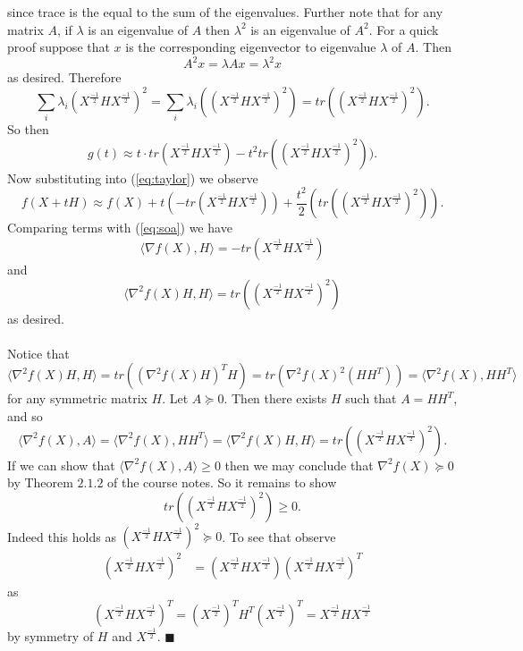 \documentclass[letterpaper,12pt,oneside,onecolumn]{article}
\newcommand{\1}{\mathbbm{1}}
\begin{document}
since trace is the equal to the sum of the eigenvalues. Further note that for any matrix $A$, if $\lambda$ is an eigenvalue of $A$ then $\lambda^2$ is an eigenvalue of $A^2$. For a quick proof suppose that $x$ is the corresponding eigenvector to eigenvalue $\lambda$ of $A$. Then
$$A^2x = \lambda Ax = \lambda^2x$$
as desired. Therefore
$$\sum_{i} \lambda_i(X^\frac{-1}{2}HX^\frac{-1}{2})^2 = \sum_{i} \lambda_i((X^\frac{-1}{2}HX^\frac{-1}{2})^2) = tr((X^\frac{-1}{2}HX^\frac{-1}{2})^2).$$
So then
$$g(t) \approx t\cdot tr(X^\frac{-1}{2}HX^\frac{-1}{2}) - t^2 tr((X^\frac{-1}{2}HX^\frac{-1}{2})^2)).$$
Now substituting into (\ref{eq:taylor}) we observe
$$f(X+tH) \approx f(X) + t(-tr(X^\frac{-1}{2}HX^\frac{-1}{2})) + \frac{t^2}{2}(tr((X^\frac{-1}{2}HX^\frac{-1}{2})^2)).$$
Comparing terms with (\ref{eq:soa}) we have
$$\langle \nabla f(X), H \rangle = -tr(X^\frac{-1}{2}HX^\frac{-1}{2})$$
and
$$\langle \nabla^2f(X)H, H\rangle = tr((X^\frac{-1}{2}HX^\frac{-1}{2})^2)$$
as desired.
\paragraph{}
Notice that
$$\langle \nabla^2f(X)H, H\rangle = tr((\nabla^2f(X)H)^TH) = tr(\nabla^2f(X)^2(HH^T)) = \langle \nabla^2f(X), HH^T\rangle$$
for any symmetric matrix $H$.
Let $A \succcurlyeq 0$. Then there exists $H$ such that $A = HH^T$, and so
$$\langle\nabla^2f(X), A \rangle = \langle \nabla^2f(X), HH^T\rangle = \langle \nabla^2f(X)H, H\rangle = tr((X^\frac{-1}{2}HX^\frac{-1}{2})^2).$$
If we can show that $\langle\nabla^2f(X), A \rangle \geq 0$ then we may conclude that $\nabla^2f(X) \succcurlyeq 0$ by Theorem $2.1.2$ of the course notes. So it remains to show
$$tr((X^\frac{-1}{2}HX^\frac{-1}{2})^2) \geq 0.$$
Indeed this holds as $(X^\frac{-1}{2}HX^\frac{-1}{2})^2 \succcurlyeq 0$. To see that observe
\begin{align*}
(X^\frac{-1}{2}HX^\frac{-1}{2})^2 &= (X^\frac{-1}{2}HX^\frac{-1}{2})(X^\frac{-1}{2}HX^\frac{-1}{2})^T
\end{align*}
as $$(X^\frac{-1}{2}HX^\frac{-1}{2})^T = (X^\frac{-1}{2})^TH^T(X^\frac{-1}{2})^T = X^\frac{-1}{2}HX^\frac{-1}{2}$$
by symmetry of $H$ and $X^\frac{-1}{2}$. $\blacksquare$
\end{document}
